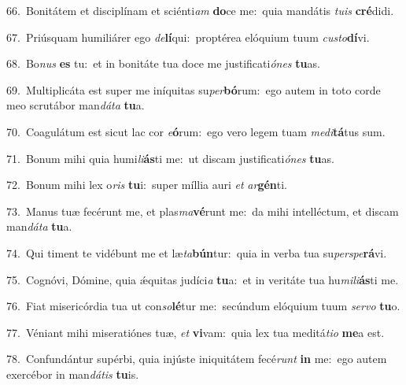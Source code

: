 {\numbfont\textcolor{\numbcolor}{66.}}~Bonitátem et disciplínam et sciénti\textit{am} \textbf{do}\-ce me:~\star quia mandátis \textit{tu}\-\textit{is} \textbf{cré}\-didi.\par
{\numbfont\textcolor{\numbcolor}{67.}}~Priúsquam humiliárer ego \textit{de}\-\textbf{lí}qui:~\star proptérea elóquium tuum \textit{cus}\-\textit{to}\textbf{dí}vi.\par
{\numbfont\textcolor{\numbcolor}{68.}}~Bo\textit{nus} \textbf{es} tu:~\star et in bonitáte tua doce me justificati\-\textit{ó}\-\textit{nes} \textbf{tu}\-as.\par
{\numbfont\textcolor{\numbcolor}{69.}}~Multiplicáta est super me iníquitas su\-\textit{per}\-\textbf{bó}rum:~\star ego autem in toto corde meo scrutábor man\-\textit{dá}\-\textit{ta} \textbf{tu}\-a.\par
{\numbfont\textcolor{\numbcolor}{70.}}~Coagulátum est sicut lac cor \textit{e}\-\textbf{ó}rum:~\star ego vero legem tuam \textit{me}\-\textit{di}\textbf{tá}tus sum.\par
{\numbfont\textcolor{\numbcolor}{71.}}~Bonum mihi quia humi\-\textit{li}\-\textbf{ás}ti me:~\star ut discam justificati\-\textit{ó}\-\textit{nes} \textbf{tu}\-as.\par
{\numbfont\textcolor{\numbcolor}{72.}}~Bonum mihi lex o\textit{ris} \textbf{tu}\-i:~\star super míllia auri \textit{et} \textit{ar}\-\textbf{gén}ti.\par
{\numbfont\textcolor{\numbcolor}{73.}}~Manus tuæ fecérunt me, et plas\-\textit{ma}\-\textbf{vé}runt me:~\star da mihi intelléctum, et discam man\-\textit{dá}\-\textit{ta} \textbf{tu}\-a.\par
{\numbfont\textcolor{\numbcolor}{74.}}~Qui timent te vidébunt me et læ\-\textit{ta}\-\textbf{bún}tur:~\star quia in verba tua su\-\textit{per}\-\textit{spe}\textbf{rá}vi.\par
{\numbfont\textcolor{\numbcolor}{75.}}~Cognóvi, Dómine, quia ǽquitas judíci\textit{a} \textbf{tu}\-a:~\star et in veritáte tua hu\-\textit{mi}\-\textit{li}\textbf{ás}ti me.\par
{\numbfont\textcolor{\numbcolor}{76.}}~Fiat misericórdia tua ut con\-\textit{so}\-\textbf{lé}tur me:~\star secúndum elóquium tuum \textit{ser}\-\textit{vo} \textbf{tu}\-o.\par
{\numbfont\textcolor{\numbcolor}{77.}}~Véniant mihi miseratiónes tuæ, \textit{et} \textbf{vi}\-vam:~\star quia lex tua meditá\-\textit{ti}\-\textit{o} \textbf{me}\-a est.\par
{\numbfont\textcolor{\numbcolor}{78.}}~Confundántur supérbi, quia injúste iniquitátem fecé\textit{runt} \textbf{in} me:~\star ego autem exercébor in man\-\textit{dá}\-\textit{tis} \textbf{tu}\-is.\par
